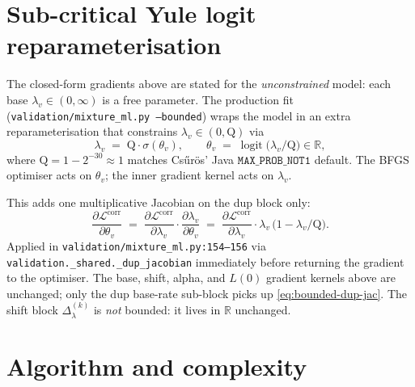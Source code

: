\documentclass[11pt]{article}
\newcommand{\R}{\mathbb{R}}
\newcommand{\dup}{\lambda}
\newcommand{\Ll}{\mathcal{L}}
\DeclareMathOperator{\logit}{logit}
\theoremstyle{definition}
\begin{document}
\section{Sub-critical Yule logit reparameterisation}
\label{sec:bounded-dup}

The closed-form gradients above are stated for the
\emph{unconstrained} model: each base $\dup_v \in (0,\infty)$ is a
free parameter. The production fit
(\texttt{validation/mixture\_ml.py --bounded}) wraps the model in an
extra reparameterisation that constrains
$\dup_v \in (0, \mathrm{Q})$ via
\begin{equation}
\dup_v \;=\; \mathrm{Q} \cdot \sigma(\theta_v),
\qquad
\theta_v \;=\; \logit\bigl(\dup_v / \mathrm{Q}\bigr) \in \R,
\label{eq:bounded-dup}
\end{equation}
where $\mathrm{Q} = 1 - 2^{-30} \approx 1$ matches Cs\H{u}r\"os'
Java $\mathtt{MAX\_PROB\_NOT1}$ default. The BFGS optimiser acts on
$\theta_v$; the inner gradient kernel acts on $\dup_v$.

This adds one multiplicative Jacobian on the dup block only:
\begin{equation}
\frac{\partial \Ll^{\mathrm{corr}}}{\partial \theta_v}
\;=\;
\frac{\partial \Ll^{\mathrm{corr}}}{\partial \dup_v}
\cdot
\frac{\partial \dup_v}{\partial \theta_v}
\;=\;
\frac{\partial \Ll^{\mathrm{corr}}}{\partial \dup_v}
\cdot \dup_v\,\bigl(1 - \dup_v/\mathrm{Q}\bigr).
\label{eq:bounded-dup-jac}
\end{equation}
Applied in
\texttt{validation/mixture\_ml.py:154--156} via
\texttt{validation.\_shared.\_dup\_jacobian} immediately before
returning the gradient to the optimiser. The base, shift, alpha, and
$L(0)$ gradient kernels above are unchanged; only the dup base-rate
sub-block picks up \eqref{eq:bounded-dup-jac}. The shift block
$\Delta_\dup^{(k)}$ is \emph{not} bounded: it lives in $\R$
unchanged.

\section{Algorithm and complexity}
\label{sec:algo}
\end{document}
